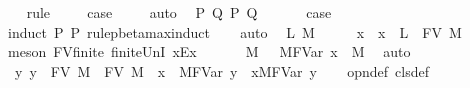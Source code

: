 \begin{isabellebody}
\ \ \isamarkupfalse%
\ {\isacharparenleft}rule\ {}{\isacharparenleft}{}{\isacharparenright}{\isacharparenright}\isanewline
\ \ \isamarkupfalse%
\ {\isacharquery}case\ \isamarkupfalse%
\ {}\ \isamarkupfalse%
\ auto\isanewline
{}\isamarkupfalse%
\isanewline
{}\isamarkupfalse%
\ {\isacharparenleft}{}\ P\ Q\ P{\isacharprime}\ Q{\isacharprime}{\isacharparenright}\isanewline
\ \ \isamarkupfalse%
\ {}{\isacharparenleft}{}{\isacharcomma}{}{\isacharcomma}{}{\isacharcomma}{}{\isacharcomma}{}{\isacharparenright}\ \isamarkupfalse%
\ {\isacharquery}case\isanewline
\ \ \isamarkupfalse%
\ {\isacharparenleft}induct\ P\ P{\isacharprime}\ rule{\isacharcolon}pbeta{\isacharunderscore}max{\isachardot}induct{\isacharparenright}\isanewline
\ \ \isamarkupfalse%
\ auto\isanewline
{}\isamarkupfalse%
\isanewline
{}\isamarkupfalse%
\ {\isacharparenleft}{}\ L\ M{\isacharparenright}\isanewline
\ \ \isamarkupfalse%
\ \isamarkupfalse%
\ x\ \ {}{\isacharcolon}{\isachardoublequoteopen}x\ {\isasymnotin}\ L\ {\isasymunion}\ FV\ M{\isachardoublequoteclose}\ \isamarkupfalse%
\ {\isacharparenleft}meson\ FV{\isacharunderscore}finite\ finite{\isacharunderscore}UnI\ x{\isacharunderscore}Ex{\isacharparenright}\isanewline
\ \ \isamarkupfalse%
\ {}\ \isamarkupfalse%
\ M{\isacharprime}\ \ {}{\isacharcolon}\ {\isachardoublequoteopen}M{\isacharcircum}FVar\ x\ {\isachargreater}{\isachargreater}{\isachargreater}\ M{\isacharprime}{\isachardoublequoteclose}\ \isamarkupfalse%
\ auto\isanewline
\isanewline
\ \ \isamarkupfalse%
\ {}{\isacharcolon}\ {\isachardoublequoteopen}{\isasymAnd}y{\isachardot}\ y\ {\isasymnotin}\ FV\ M{\isacharprime}\ {\isasymunion}\ FV\ M\ {\isasymunion}\ {\isacharbraceleft}x{\isacharbraceright}\ {\isasymLongrightarrow}\ M{\isacharcircum}FVar\ y\ {\isachargreater}{\isachargreater}{\isachargreater}\ {\isacharparenleft}{\isacharbackslash}x{\isacharcircum}M{\isacharprime}{\isacharparenright}{\isacharcircum}FVar\ y{\isachardoublequoteclose}\isanewline
\ \ \isamarkupfalse%
\ opn{\isacharprime}{\isacharunderscore}def\ cls{\isacharprime}{\isacharunderscore}def\ \isanewline

\end{isabellebody}
